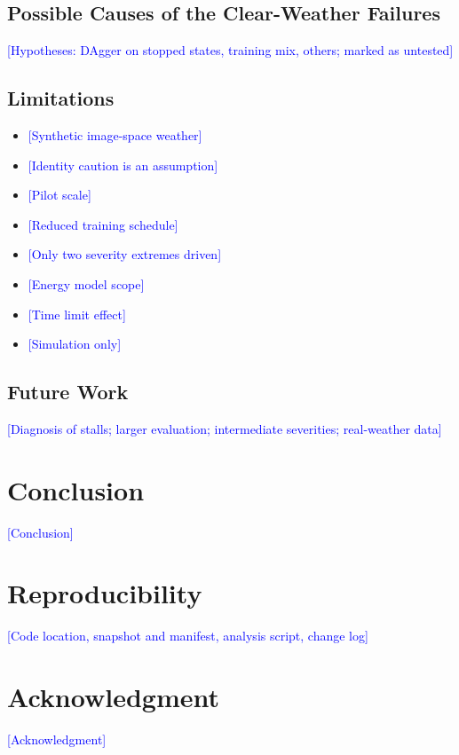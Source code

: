 \documentclass[conference]{IEEEtran}
\newcommand{\placeholder}[1]{\textcolor{blue}{[#1]}}
\begin{document}
\subsection{Possible Causes of the Clear-Weather Failures}
\placeholder{Hypotheses: DAgger on stopped states, training mix, others; marked as untested}
\subsection{Limitations}\label{sec:limits}
\begin{itemize}
\item \placeholder{Synthetic image-space weather}
\item \placeholder{Identity caution is an assumption}
\item \placeholder{Pilot scale}
\item \placeholder{Reduced training schedule}
\item \placeholder{Only two severity extremes driven}
\item \placeholder{Energy model scope}
\item \placeholder{Time limit effect}
\item \placeholder{Simulation only}
\end{itemize}
\subsection{Future Work}
\placeholder{Diagnosis of stalls; larger evaluation; intermediate severities; real-weather data}

\section{Conclusion}\label{sec:conclusion}
\placeholder{Conclusion}

\section*{Reproducibility}
\placeholder{Code location, snapshot and manifest, analysis script, change log}

\section*{Acknowledgment}
\placeholder{Acknowledgment}

\appendices
\end{document}
